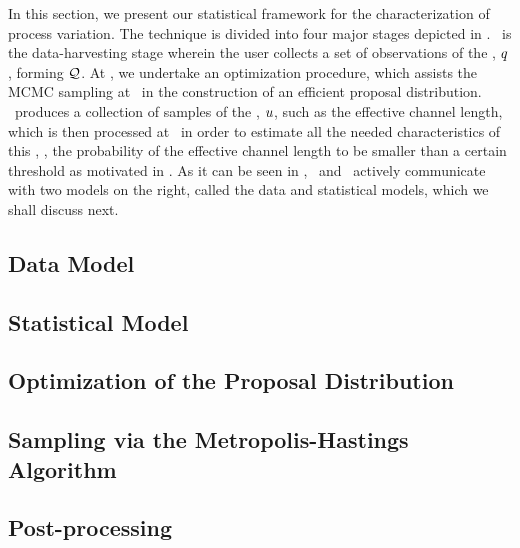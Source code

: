 
In this section, we present our statistical framework for the characterization of process variation.
The technique is divided into four major stages depicted in .
\ is the data-harvesting stage wherein the user collects a set of observations of the \qom, $q$, forming $\mathcal{Q}$.
At , we undertake an optimization procedure, which assists the MCMC sampling at \ in the construction of an efficient proposal distribution.
\ produces a collection of samples of the \qoi, $u$, such as the effective channel length, which is then processed at \ in order to estimate all the needed characteristics of this \qoi, \eg, the probability of the effective channel length to be smaller than a certain threshold as motivated in .
As it can be seen in , \ and \ actively communicate with two models on the right, called the data and statistical models, which we shall discuss next.

\subsection{Data Model} 


\subsection{Statistical Model} 


\subsection{Optimization of the Proposal Distribution} 


\subsection{Sampling via the Metropolis-Hastings Algorithm} 


\subsection{Post-processing} 

